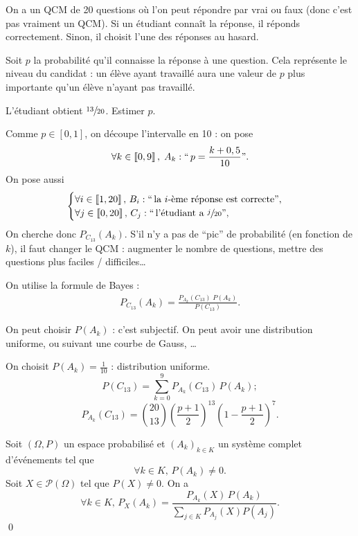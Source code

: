 \begin{exm}[QCM]
	On a un QCM de 20 questions où l'on peut répondre par vrai ou faux (donc c'est pas vraiment un QCM). Si un étudiant connaît la réponse, il réponds correctement. Sinon, il choisit l'une des réponses au hasard.

	Soit $p$ la probabilité qu'il connaisse la réponse à une question. Cela représente le niveau du candidat : un élève ayant travaillé aura une valeur de $p$ plus importante qu'un élève n'ayant pas travaillé.

	L'étudiant obtient $\sfrac{13}{20}$. Estimer $p$.

	Comme $p \in [0,1]$, on découpe l'intervalle en 10 : on pose \[
		\forall k \in \left\llbracket 0,9 \right\rrbracket,\; A_k : ``\,p = \frac{k+0,5}{10}".
	\] On pose aussi \[
	\begin{cases}
		\forall i \in \left\llbracket 1,20 \right\rrbracket,\, B_i : ``\,\text{la } i\text{-ème réponse est correcte}",\\
		\forall j \in \left\llbracket 0,20 \right\rrbracket,\, C_j : ``\,\text{l'étudiant a } \sfrac{j}{20}",\\
	\end{cases}
	\] On cherche donc $P_{C_{13}}(A_k)$. S'il n'y a pas de ``pic'' de probabilité (en fonction de $k$), il faut changer le QCM : augmenter le nombre de questions, mettre des questions plus faciles / difficiles\ldots

	On utilise la formule de Bayes :
	\begin{align*}
		P_{C_{13}}(A_k) = \frac{P_{A_k}(C_{13})\;P(A_k)}{P(C_{13})}.
	\end{align*}

	On peut choisir $P(A_k)$ : c'est subjectif. On peut avoir une distribution uniforme, ou suivant une courbe de Gauss, \ldots

	On choisit $P(A_k) = \frac{1}{10}$ : distribution uniforme.
	\[
		P(C_{13}) = \sum_{k=0}^9 P_{A_k}(C_{13}) \,P(A_k);
	\] \[
		P_{A_k}(C_{13}) = {20 \choose 13} \left(\frac{p+1}{2}\right)^{13} \left( 1-\frac{p+1}{2} \right)^7.
	\]
\end{exm}

\begin{prop}[Bayes]
	Soit $(\Omega, P)$ un espace probabilisé et $(A_k)_{k \in K}$ un système complet d'événements tel que \[
		\forall k \in K,\, P(A_k) \neq 0.
	\] Soit $X \in \mathcal{P}(\Omega)$ tel que $P(X) \neq 0$. On a \[
		\forall k \in K,\, P_X(A_k) = \frac{P_{A_k}(X)\,P(A_k)}{\sum_{j \in K}P_{A_j}(X) P(A_j)}.
	\]\qed
\end{prop}

